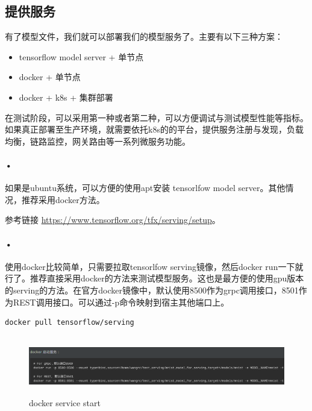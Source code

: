 \documentclass[12pt,a4paper,oneside]{article}
\begin{document}
\begin{CJK*}{UTF8}{gbsn}
\section{提供服务}
有了模型文件，我们就可以部署我们的模型服务了。主要有以下三种方案：
\begin{itemize}
\item tensorflow model server + 单节点
\item docker + 单节点
\item docker + k8s + 集群部署
\end{itemize}
在测试阶段，可以采用第一种或者第二种，可以方便调试与测试模型性能等指标。如果真正部署至生产环境，就需要依托k8s的的平台，提供服务注册与发现，负载均衡，链路监控，网关路由等一系列微服务功能。

\paragraph{•} 如果是ubuntu系统，可以方便的使用apt安装 tensorlfow model server。其他情况，推荐采用docker方法。

参考链接 \url{https://www.tensorflow.org/tfx/serving/setup}。

\paragraph{•} 使用docker比较简单，只需要拉取tensorlfow serving镜像，然后docker run一下就行了。推荐直接采用docker的方法来测试模型服务。这也是最方便的使用gpu版本的serving的方法。在官方docker镜像中，默认使用8500作为grpc调用接口，8501作为REST调用接口。可以通过-p命令映射到宿主其他端口上。
\begin{lstlisting}
docker pull tensorflow/serving
\end{lstlisting}

\begin{figure}[H]
\centering
\includegraphics[width=6in,height=1in]{dockerstart}
\caption{docker service start}
\end{figure}


\end{CJK*}
\end{document}
